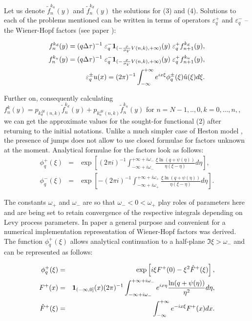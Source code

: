 \documentclass[a4paper]{jpconf}
\begin{document}
Let us denote $\widetilde{f}_n^{k_u}(y)$ and $\widetilde{f}_n^{k_d}(y)$ the solutions for (3) and (4). Solutions to each of the problems mentioned can be written in terms of operators $\varepsilon^{+}_{q}$ and $\varepsilon^{-}_{q}$ -- the Wiener-Hopf factors (see paper \cite{kudr_and_lev}):

\begin{eqnarray*}
	f_{n}^{k_{d}}(y) = (q{\Delta \tau})^{-1} \; \varepsilon^{-}_{q} {\bf 1}_{(- \frac{\rho}{\sigma_V}V(n,k), +\infty)}(y) \; \varepsilon^{+}_{q} f_{n+1}^{k_d}(y),\\
	f_{n}^{k_{u}}(y) = (q{\Delta \tau})^{-1} \; \varepsilon^{-}_{q} {\bf 1}_{(- \frac{\rho}{\sigma_V}V(n,k), +\infty)}(y) \; \varepsilon^{+}_{q} f_{n+1}^{k_u}(y),\\
	\varepsilon^\pm_q u(x) = (2\pi)^{-1} \int_{-\infty}^{+\infty} e^{ix\xi} \phi^\pm_q (\xi) \hat{u}(\xi) d\xi.
\end{eqnarray*}

Further on, consequently calculating $f_{n}^{k}(y) = p_{k^{{\Delta t}}_{d}(n,k)}\widetilde{f}^{k_d}_{n}(y) + p_{k^{{\Delta t}}_{u}(n,k)}\widetilde{f}^{k_u}_{n}(y)$ for $n=N-1,..,0, k = 0,...,n,$, we can get the approximate values for the sought-for functional (2) after returning to the initial notations. Unlike a much simpler case of Heston model \cite{kudr_rod}, the presence of jumps does not allow to use closed formulae for factors unknown at the moment. Analytical formulae for the factors look as follows:
\begin{eqnarray*}
	\phi^+_q(\xi)&=&\exp\left[(2\pi i)^{-1}
	\int_{-\infty+i\omega_-}^{+\infty+i\omega_-}\frac{\xi\ln(q+\psi(\eta))}
	{\eta(\xi-\eta)}d\eta\right],\\
	\phi^-_q(\xi)&=&\exp\left[-(2\pi i)^{-1}
	\int_{-\infty+i\omega_+}^{+\infty+i\omega_+}\frac{\xi\ln(q+\psi(\eta))}
	{\eta(\xi-\eta)}d\eta\right].
\end{eqnarray*}

The constants $\omega_+$ and $\omega_-$ are so that $\omega_-<0<\omega_+$ play roles of parameters here and are being set to retain convergence of the respective integrals depending on Levy process parameters. In paper \cite{kudr_mex} a general purpose and convenient for a numerical implementation representation of Wiener-Hopf factors was derived. The function $\phi^+_q(\xi)$ allows analytical continuation to a half-plane $\Im \xi>\omega_-$ and can be represented as follows:

\begin{eqnarray*}
	\phi^+_q(\xi)&=&\exp\left[i\xi F^+(0)-\xi^2\hat{F}^+(\xi)\right],\\ 
	F^+(x)&=&{\bf 1}_{(-\infty,0]}(x)(2\pi)^{-1}
	\int_{-\infty+i\omega_-}^{+\infty+i\omega_-}e^{ix\eta}\frac{\ln(q+\psi(\eta))}
	{\eta^2}d\eta,
	\\
	\hat{F}^+(\xi)&=&\int_{-\infty}^{+\infty}e^{-ix\xi}F^+(x)dx.
\end{eqnarray*}
\end{document}
